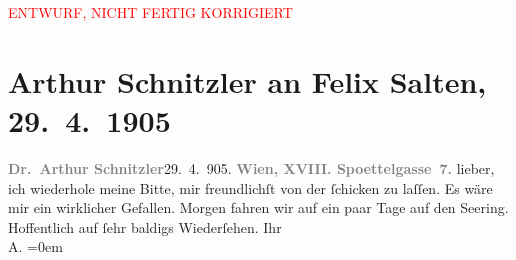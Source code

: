
\begin{center}
            \textcolor{red}{ENTWURF, NICHT FERTIG KORRIGIERT}
                      \end{center}
            
         
         \renewcommand{\erwaehntePersonen}{Personen: Felix Salten}
         \renewcommand{\erwaehnteOrte}{Orte: Edmund-Weiß-Gasse, Semmering, Wien}
         \renewcommand{\erwaehnteWerke}{Werke: Schiller-Zeit 1805 * 1905}
               \section[Arthur Schnitzler an Felix Salten, 29. 4. 1905]{ Arthur Schnitzler an Felix Salten, 29. 4. 1905}\nopagebreak{}\rehead{ }\begin{ledgroupsized}[t]{13cm}\normalsize\beginnumbering \toendnotes[C]{\smallbreak\pagebreak[2]} 
\toendnotes[C]{\smallbreak}\pstart
           \noindent{}\textcolor{gray}{\textbf{{\pb}Dr. Arthur Schnitzler}}\hfill 29. 4. 905.\pend
           \pstart
           \textcolor{gray}{\textbf{Wien, XVIII. Spoettelgasse 7.}}\pend
           \pstart
           lieber, ich wiederhole meine Bitte, mir freundlichſt von der \label{K_L02999-1v}\label{K_L02999-1h} ſchicken zu laſſen. Es wäre mir ein wirklicher Gefallen. \pend
           \pstart
           Morgen fahren wir auf ein paar Tage {\pb}auf den
                  Se{\geminationm}ering.
               Hoffentlich auf ſehr baldigs Wiederſehen. \pend
           \pstart
           Ihr {\\[\baselineskip]}\spacefill\mbox{A.}\pend
           \leftskip=0em{}
         
         \endnumbering{}\end{ledgroupsized}\begin{anhang}\end{anhang}\newcommand{\dateiname}{L02999}\newcommand{\titel}{Arthur Schnitzler an Felix Salten, 29. 4. 1905}\newcommand{\editorInnen}{Martin Anton Müller und Laura Untner}
      